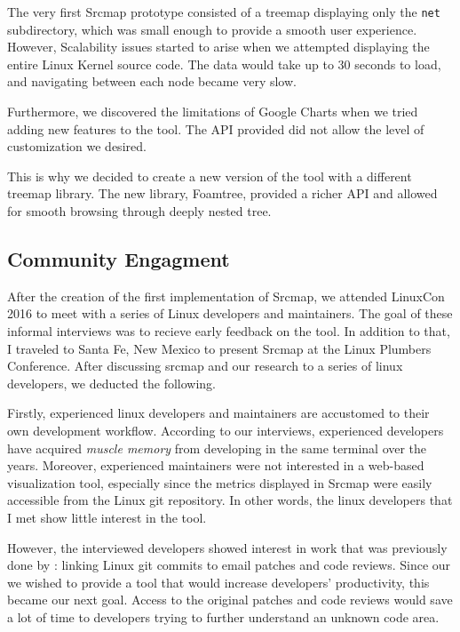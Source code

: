 The very first Srcmap prototype consisted of a treemap displaying only the \texttt{net} subdirectory, which was small enough to provide a smooth user experience. However, Scalability issues started to arise when we attempted displaying the entire Linux Kernel source code. The data would take up to 30 seconds to load, and navigating between each node became very slow.


Furthermore, we discovered the limitations of Google Charts when we tried adding new features to the tool. The API provided did not allow the level of customization we desired. 


This is why we decided to create a new version of the tool with a different treemap library. The new library, Foamtree, provided a richer API and allowed for smooth browsing through deeply nested tree.





\subsection{Community Engagment}

After the creation of the first implementation of Srcmap, we attended LinuxCon 2016 to meet with a series of Linux developers and maintainers. The goal of these informal interviews was to recieve early feedback on the tool. In addition to that, I traveled to Santa Fe, New Mexico to present Srcmap at the Linux Plumbers Conference. After discussing srcmap and our research to a series of linux developers, we deducted the following. 

Firstly, experienced linux developers and maintainers are accustomed to their own development workflow. According to our interviews, experienced developers have acquired \textit{muscle memory} from developing in the same terminal over the years. Moreover, experienced maintainers were not interested in a web-based visualization tool, especially since the metrics displayed in Srcmap were easily accessible from the Linux git repository. In other words, the linux developers that I met show little interest in the tool. 

However, the interviewed developers showed interest in work that was previously done by \cite{jiang14}: linking Linux git commits to email patches and code reviews. Since our we wished to provide a tool that would increase developers' productivity, this became our next goal. Access to the original patches and code reviews would save a lot of time to developers trying to further understand an unknown code area. 




